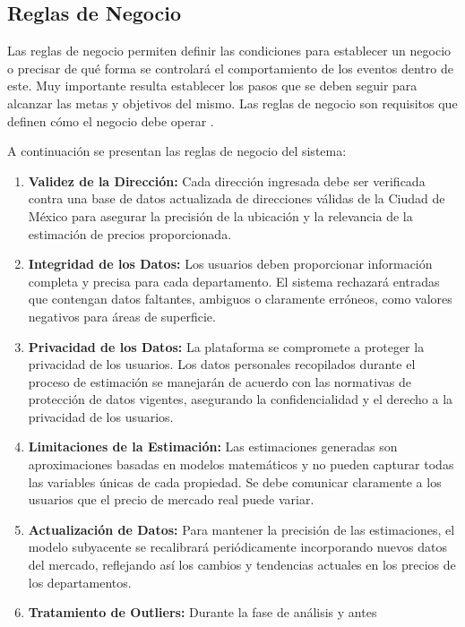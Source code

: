 \subsection{Reglas de Negocio}

Las reglas de negocio permiten definir las condiciones para establecer un negocio o
precisar de qué forma se controlará el comportamiento de los eventos dentro de
este. Muy importante resulta establecer los pasos que se deben seguir para alcanzar las
metas y objetivos del mismo. Las reglas de negocio son requisitos que definen cómo el
negocio debe operar \cite{181439409006}.

A continuación se presentan las reglas de negocio del sistema:

\begin{enumerate}
  \item \textbf{Validez de la Dirección:} Cada dirección ingresada debe ser
    verificada contra una base de datos actualizada de direcciones válidas de la
    Ciudad de México para asegurar la precisión de la ubicación y la relevancia
    de la estimación de precios proporcionada.
  \item \textbf{Integridad de los Datos:} Los usuarios deben proporcionar información
    completa y precisa para cada departamento. El sistema rechazará entradas que
    contengan datos faltantes, ambiguos o claramente erróneos, como valores
    negativos para áreas de superficie.
  \item \textbf{Privacidad de los Datos:} La plataforma se compromete a proteger
    la privacidad de los usuarios. Los datos personales recopilados durante el
    proceso de estimación se manejarán de acuerdo con las normativas de protección
    de datos vigentes, asegurando la confidencialidad y el derecho a la privacidad
    de los usuarios.
  \item \textbf{Limitaciones de la Estimación:} Las estimaciones generadas son
    aproximaciones basadas en modelos matemáticos y no pueden capturar todas las
    variables únicas de cada propiedad. Se debe comunicar claramente a los
    usuarios que el precio de mercado real puede variar.
  \item \textbf{Actualización de Datos:} Para mantener la precisión de las
    estimaciones, el modelo subyacente se recalibrará periódicamente incorporando
    nuevos datos del mercado, reflejando así los cambios y tendencias actuales en
    los precios de los departamentos.
  \item \textbf{Tratamiento de Outliers:} Durante la fase de análisis y antes

\end{enumerate}
